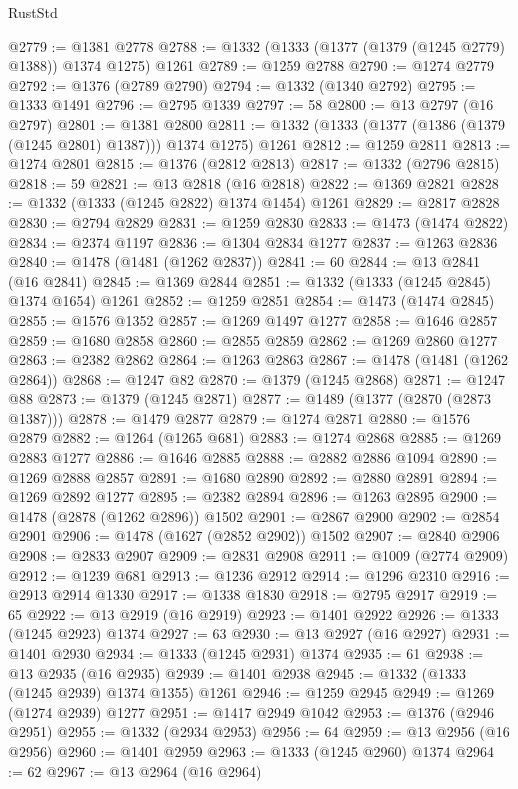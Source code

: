 \begin{lexlean}{RustStd}
\begin{coremodule}
@2779 := @1381 @2778
@2788 := @1332 (@1333 (@1377 (@1379 (@1245 @2779) @1388)) @1374 @1275) @1261
@2789 := @1259 @2788
@2790 := @1274 @2779
@2792 := @1376 (@2789 @2790)
@2794 := @1332 (@1340 @2792)
@2795 := @1333 @1491
@2796 := @2795 @1339
@2797 := 58
@2800 := @13 @2797 (@16 @2797)
@2801 := @1381 @2800
@2811 := @1332 (@1333 (@1377 (@1386 (@1379 (@1245 @2801) @1387))) @1374 @1275) @1261
@2812 := @1259 @2811
@2813 := @1274 @2801
@2815 := @1376 (@2812 @2813)
@2817 := @1332 (@2796 @2815)
@2818 := 59
@2821 := @13 @2818 (@16 @2818)
@2822 := @1369 @2821
@2828 := @1332 (@1333 (@1245 @2822) @1374 @1454) @1261
@2829 := @2817 @2828
@2830 := @2794 @2829
@2831 := @1259 @2830
@2833 := @1473 (@1474 @2822)
@2834 := @2374 @1197
@2836 := @1304 @2834 @1277
@2837 := @1263 @2836
@2840 := @1478 (@1481 (@1262 @2837))
@2841 := 60
@2844 := @13 @2841 (@16 @2841)
@2845 := @1369 @2844
@2851 := @1332 (@1333 (@1245 @2845) @1374 @1654) @1261
@2852 := @1259 @2851
@2854 := @1473 (@1474 @2845)
@2855 := @1576 @1352
@2857 := @1269 @1497 @1277
@2858 := @1646 @2857
@2859 := @1680 @2858
@2860 := @2855 @2859
@2862 := @1269 @2860 @1277
@2863 := @2382 @2862
@2864 := @1263 @2863
@2867 := @1478 (@1481 (@1262 @2864))
@2868 := @1247 @82
@2870 := @1379 (@1245 @2868)
@2871 := @1247 @88
@2873 := @1379 (@1245 @2871)
@2877 := @1489 (@1377 (@2870 (@2873 @1387)))
@2878 := @1479 @2877
@2879 := @1274 @2871
@2880 := @1576 @2879
@2882 := @1264 (@1265 @681)
@2883 := @1274 @2868
@2885 := @1269 @2883 @1277
@2886 := @1646 @2885
@2888 := @2882 @2886 @1094
@2890 := @1269 @2888 @2857
@2891 := @1680 @2890
@2892 := @2880 @2891
@2894 := @1269 @2892 @1277
@2895 := @2382 @2894
@2896 := @1263 @2895
@2900 := @1478 (@2878 (@1262 @2896)) @1502
@2901 := @2867 @2900
@2902 := @2854 @2901
@2906 := @1478 (@1627 (@2852 @2902)) @1502
@2907 := @2840 @2906
@2908 := @2833 @2907
@2909 := @2831 @2908
@2911 := @1009 (@2774 @2909)
@2912 := @1239 @681
@2913 := @1236 @2912
@2914 := @1296 @2310
@2916 := @2913 @2914 @1330
@2917 := @1338 @1830
@2918 := @2795 @2917
@2919 := 65
@2922 := @13 @2919 (@16 @2919)
@2923 := @1401 @2922
@2926 := @1333 (@1245 @2923) @1374
@2927 := 63
@2930 := @13 @2927 (@16 @2927)
@2931 := @1401 @2930
@2934 := @1333 (@1245 @2931) @1374
@2935 := 61
@2938 := @13 @2935 (@16 @2935)
@2939 := @1401 @2938
@2945 := @1332 (@1333 (@1245 @2939) @1374 @1355) @1261
@2946 := @1259 @2945
@2949 := @1269 (@1274 @2939) @1277
@2951 := @1417 @2949 @1042
@2953 := @1376 (@2946 @2951)
@2955 := @1332 (@2934 @2953)
@2956 := 64
@2959 := @13 @2956 (@16 @2956)
@2960 := @1401 @2959
@2963 := @1333 (@1245 @2960) @1374
@2964 := 62
@2967 := @13 @2964 (@16 @2964)

\end{coremodule}
\end{lexlean}
